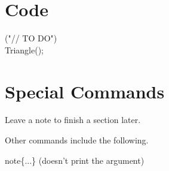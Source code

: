 \section{Code}
\begin{code}{}
    \codeitem \codepragma{} \codemessage{}("// TO DO") \\
    \stepcodelevel
        \codenew{} Triangle();\\
        \prevcodelevel
\end{code}
\vspace{0.5\baselineskip}


\section{Special Commands}
Leave a note to finish a section later.
\notfinished{}


Other commands include the following.
\begin{bulletedlist}
	\item {}
	\item {}
	\item {} \tbs{}note\{...\} (doesn't print the argument)
\end{bulletedlist} 